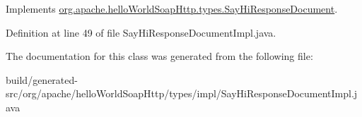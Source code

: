 Implements \hyperlink{interfaceorg_1_1apache_1_1hello_world_soap_http_1_1types_1_1_say_hi_response_document_af5efff9b1dcd17f453b88bdf8f64cd59}{org.\+apache.\+hello\+World\+Soap\+Http.\+types.\+Say\+Hi\+Response\+Document}.



Definition at line 49 of file Say\+Hi\+Response\+Document\+Impl.\+java.



The documentation for this class was generated from the following file\+:\begin{DoxyCompactItemize}
\item 
build/generated-\/src/org/apache/hello\+World\+Soap\+Http/types/impl/Say\+Hi\+Response\+Document\+Impl.\+java\end{DoxyCompactItemize}
